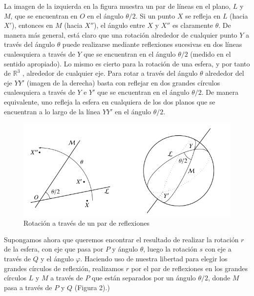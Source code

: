 \documentclass[11pt]{book}
\numberwithin{equation}{section}
\theoremstyle{plain}  %
\begin{document}
La imagen de la izquierda en la figura muestra un par de líneas en el plano, 
$L$ y $M$, que se encuentran en $O$ en el ángulo $\theta/2$. Si
un punto $X$ se refleja en $L$ (hacia $X'$), entonces en $M$ (hacia $X''$),
el ángulo entre $X$ y $X''$ es claramente $\theta$. De manera más general,
está claro que una rotación alrededor de cualquier punto $Y$ a
través del ángulo $\theta$ puede realizarse mediante reflexiones
sucesivas en dos líneas cualesquiera a través de $Y$ que se
encuentran en el ángulo $\theta/2$ (medido en el sentido apropiado).
Lo mismo es cierto para la rotación de una esfera, y por tanto
de $\mathbb{R}^{3}$ , alrededor de cualquier eje. 
Para rotar a través del
ángulo $\theta$ alrededor del eje $YY'$ (imagen de la derecha) basta con
reflejar en dos grandes círculos cualesquiera a través de $Y$ e $Y'$
que se encuentran en el ángulo $\theta/2$. De manera equivalente, uno
refleja la esfera en cualquiera de los dos planos que se
encuentran a lo largo de la línea $YY'$ en el ángulo $\theta/2$.

\begin{figure}[h]
\centering
\includegraphics[scale=0.5]{imagenes/23.3-1.png}
\caption{Rotación a través de un par de reflexiones}
\end{figure}

Supongamos ahora que queremos encontrar el resultado de
realizar la rotación $r$ de la esfera, con eje que pasa por $P$ y
ángulo $\theta$, luego la rotación $s$ con eje
a través de $Q$ y el ángulo $\varphi$. Haciendo uso de nuestra
libertad para elegir los grandes círculos de reflexión,
realizamos $r$ por el par de reflexiones en los grandes
círculos $L$ y $M$ a través de $P$ que están separados por un ángulo $\theta/2$, donde $M$ pasa a través de $P$ y $Q$ (Figura 2).)
\end{document}
